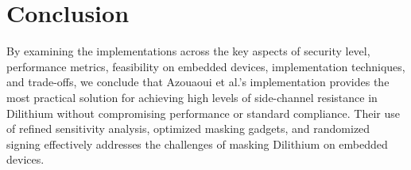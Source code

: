 \section{Conclusion}

By examining the implementations across the key aspects of security level, performance metrics, feasibility on embedded devices, implementation techniques, and trade-offs, we conclude that Azouaoui et al.'s implementation provides the most practical solution for achieving high levels of side-channel resistance in Dilithium without compromising performance or standard compliance. Their use of refined sensitivity analysis, optimized masking gadgets, and randomized signing effectively addresses the challenges of masking Dilithium on embedded devices.
